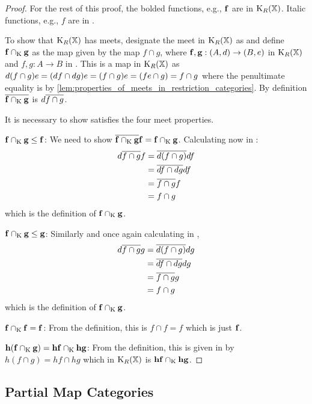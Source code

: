 \begin{proof}
For the rest of this proof, the bolded functions, e.g., $\mathbf{f}$ are in $\text{K}_{R}(\mathbb{X})$.
Italic functions, e.g., $f$ are in \X.

To show that $\text{K}_{R}(\mathbb{X})$ has meets,  designate the meet in $\text{K}_{R}(\mathbb{X})$ as \capspl
and define $\mathbf{f} \cap_{\text{K}} \mathbf{g}$ as the map given by the \X map $f \cap g$, where
$\mathbf{f},\mathbf{g}:(A,d)\to(B,e)$ in $\text{K}_{R}(\mathbb{X})$ and $f,g:A\to B$ in \X . This is
a map in $\text{K}_{R}(\mathbb{X})$ as
$d(f \cap g)e = (d\hspace{0.1pt} f \cap d\hspace{0.1pt} g) e = (f \cap g) e = (f e \cap g) = f\cap g$
 where the penultimate equality is by \vref{lem:properties_of_meets_in_restriction_categories}. By definition
 $\overline{\mathbf{f} \cap_{\text{K}} \mathbf{g} }$ is $d\overline{f\cap g}$.

It is necessary to show \capspl satisfies the four meet properties.
\bi
\item{$\mathbf{f}\cap_{\text{K}} \mathbf{g} \le \mathbf{f}$: } We need to show
$\overline{\mathbf{f} \cap_{\text{K}} \mathbf{g}} \mathbf{f} =  \mathbf{f} \cap_{\text{K}} \mathbf{g}$.  Calculating now in \X:
\begin{align*}
d \overline{f \cap g} f&= \overline{d(f\cap g)} d f\\
& = \overline{df \cap dg} df \\
& = \overline{f \cap g} f \\
& = f \cap g
\end{align*}
which is the definition of $\mathbf{f} \cap_{\text{K}} \mathbf{g}$.
\item{$\mathbf{f}\cap_{\text{K}} \mathbf{g} \le \mathbf{g}$: } Similarly and once again calculating in \X,
\begin{align*}
d \overline{f \cap g} g&= \overline{d(f\cap g)} d g\\
& = \overline{df \cap dg} dg \\
& = \overline{f \cap g} g \\
& = f \cap g
\end{align*}
which is the definition of $\mathbf{f} \cap_{\text{K}} \mathbf{g}$.
\item{$\mathbf{f}\cap_{\text{K}} \mathbf{f} = \mathbf{f}$: } From the definition, this is $f \cap f = f$ which
is just $ \mathbf{f}$.
\item{$\mathbf{h}(\mathbf{f}\cap_{\text{K}} \mathbf{g}) = \mathbf{h}\mathbf{f} \cap_{\text{K}} \mathbf{h}\mathbf{g}$: }
From the definition, this is given in \X by $ h (f \cap g) =
h f \cap h g$ which in $\text{K}_{R}(\mathbb{X})$ is $\mathbf{h}\mathbf{f} \cap_{\text{K}} \mathbf{h}\mathbf{g}$.
\ei
\end{proof}



\subsection{Partial Map Categories} %
\label{sub:partial_map_categories}

